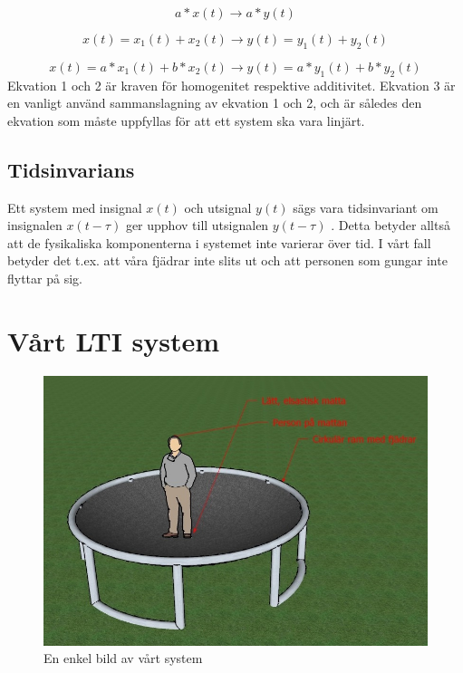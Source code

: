 \documentclass[10pt,a4paper]{article}
\begin{document}
\begin{equation}
a*x(t) \rightarrow a*y(t) 
\end{equation}

\begin{equation}
x(t) = x_1(t) + x_2(t) \rightarrow y(t) = y_1(t) + y_2(t)
\end{equation}

\begin{equation}
x(t) = a*x_1(t) + b*x_2(t)\rightarrow y(t) = a*y_1(t) + b*y_2(t)
\end{equation}
\linebreak
Ekvation 1 och 2 är kraven för homogenitet respektive additivitet. Ekvation 3 är en vanligt använd sammanslagning av ekvation 1 och 2, och är således den ekvation som måste uppfyllas för att ett system ska vara linjärt. \cite{sune2000}


\subsection{Tidsinvarians}


Ett system med insignal $x(t)$ och utsignal $y(t)$ sägs vara tidsinvariant om insignalen $x(t - \tau)$ ger upphov till utsignalen $y(t - \tau)$ \cite{sune2000}. Detta betyder alltså att de fysikaliska komponenterna i systemet inte varierar över tid. I vårt fall betyder det t.ex. att våra fjädrar inte slits ut och att personen som gungar inte flyttar på sig. 

\newpage
\section{Vårt LTI system}

\begin{figure}[ht]
\caption{En enkel bild av vårt system}
\includegraphics[scale=0.8]{Bild2}
\end{figure}
\clearpage
\end{document}
